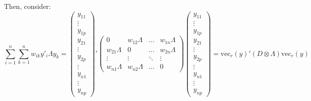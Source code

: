 \documentclass{article}
\begin{document}
Then, consider:
$$
 \sum_{i=1}^n \sum_{k=1}^n w_{ik} y'_i \Lambda y_k = 
\begin{pmatrix}
y_{11} \\ \vdots \\ y_{1p} \\ y_{21} \\ \vdots \\ y_{2p} \\ \vdots \\y_{n1} \\ \vdots \\ y_{np}
\end{pmatrix}'
\begin{pmatrix}
0 & w_{12} \Lambda & \ldots & w_{1n} \Lambda\\
w_{21} \Lambda & 0 & \ldots & w_{2n} \Lambda\\
\vdots & \vdots & \ddots & \vdots \\
w_{n1} \Lambda & w_{n2} \Lambda & \ldots & 0
\end{pmatrix}
\begin{pmatrix}
y_{11} \\ \vdots \\ y_{1p} \\ y_{21} \\ \vdots \\ y_{2p} \\ \vdots \\y_{n1} \\ \vdots \\ y_{np}
\end{pmatrix}  = 
\mathrm{vec}_r(y) ' (D \otimes \Lambda) \mathrm{vec}_r(y)
$$
\end{document}
